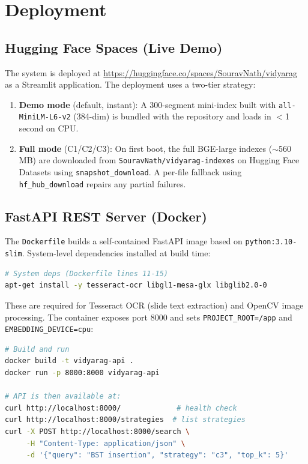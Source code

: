 \documentclass[12pt,a4paper]{article}
\begin{document}
\newpage
\section{Deployment}

\subsection{Hugging Face Spaces (Live Demo)}

The system is deployed at \url{https://huggingface.co/spaces/SouravNath/vidyarag} as a Streamlit application. The deployment uses a two-tier strategy:

\begin{enumerate}[leftmargin=1.5em]
  \item \textbf{Demo mode} (default, instant): A 300-segment mini-index built with \texttt{all-MiniLM-L6-v2} (384-dim) is bundled with the repository and loads in $<$1 second on CPU.
  \item \textbf{Full mode} (C1/C2/C3): On first boot, the full BGE-large indexes ($\sim$560\,MB) are downloaded from \texttt{SouravNath/vidyarag-indexes} on Hugging Face Datasets using \texttt{snapshot\_download}. A per-file fallback using \texttt{hf\_hub\_download} repairs any partial failures.
\end{enumerate}

\subsection{FastAPI REST Server (Docker)}

The \texttt{Dockerfile} builds a self-contained FastAPI image based on \texttt{python:3.10-slim}. System-level dependencies installed at build time:

\begin{lstlisting}[language=bash]
# System deps (Dockerfile lines 11-15)
apt-get install -y tesseract-ocr libgl1-mesa-glx libglib2.0-0
\end{lstlisting}

These are required for Tesseract OCR (slide text extraction) and OpenCV image processing. The container exposes port 8000 and sets \texttt{PROJECT\_ROOT=/app} and \texttt{EMBEDDING\_DEVICE=cpu}:

\begin{lstlisting}[language=bash]
# Build and run
docker build -t vidyarag-api .
docker run -p 8000:8000 vidyarag-api

# API is then available at:
curl http://localhost:8000/             # health check
curl http://localhost:8000/strategies  # list strategies
curl -X POST http://localhost:8000/search \
     -H "Content-Type: application/json" \
     -d '{"query": "BST insertion", "strategy": "c3", "top_k": 5}'
\end{lstlisting}
\end{document}
